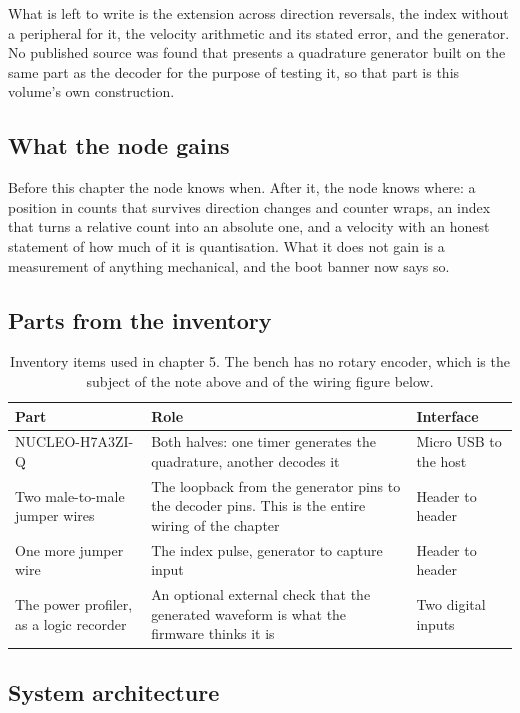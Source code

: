 What is left to write is the extension across direction reversals, the index
without a peripheral for it, the velocity arithmetic and its stated error, and
the generator. No published source was found that presents a quadrature
generator built on the same part as the decoder for the purpose of testing it,
so that part is this volume's own construction.

\subsection*{What the node gains}

Before this chapter the node knows when. After it, the node knows where: a
position in counts that survives direction changes and counter wraps, an index
that turns a relative count into an absolute one, and a velocity with an honest
statement of how much of it is quantisation. What it does not gain is a
measurement of anything mechanical, and the boot banner now says so.

\subsection*{Parts from the inventory}

\begin{table}[H]\centering\small
\begin{tabular}{p{40mm}p{66mm}p{40mm}}
\toprule
Part & Role & Interface \\
\midrule
NUCLEO-H7A3ZI-Q & Both halves: one timer generates the quadrature, another decodes it & Micro USB to the host \\
Two male-to-male jumper wires & The loopback from the generator pins to the decoder pins. This is the entire wiring of the chapter & Header to header \\
One more jumper wire & The index pulse, generator to capture input & Header to header \\
The power profiler, as a logic recorder & An optional external check that the generated waveform is what the firmware thinks it is & Two digital inputs \\
\bottomrule
\end{tabular}
\caption{Inventory items used in chapter 5. The bench has no rotary encoder, which is the subject of the note above and of the wiring figure below.}
\end{table}

\subsection*{System architecture}

